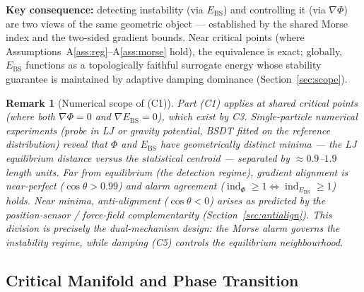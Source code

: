 \documentclass[11pt,a4paper]{article}
\newcommand{\Ebs}{E_{\mathrm{BS}}}
\newcommand{\costheta}{\cos\theta}
\newcommand{\grad}{\nabla}
\DeclareMathOperator{\ind}{ind}
\newtheorem{remark}[theorem]{Remark}
\begin{document}
\noindent
\textbf{Key consequence:} detecting instability (via
$\Ebs$) and controlling it (via $\grad\Phi$) are two views of the
same geometric object --- established by the shared Morse index
and the two-sided gradient bounds.  Near critical points (where
Assumptions~A\ref{ass:reg}--A\ref{ass:morse} hold), the equivalence
is exact; globally, $\Ebs$ functions as a topologically faithful
surrogate energy whose stability guarantee is maintained by
adaptive damping dominance (Section~\ref{sec:scope}).

\begin{remark}[Numerical scope of (C1)]\label{rem:c1num}
Part (C1) applies at \emph{shared} critical points (where both
$\grad\Phi=0$ and $\grad\Ebs=0$), which exist by C3.
Single-particle numerical experiments (probe in LJ or gravity
potential, BSDT fitted on the reference distribution) reveal that
$\Phi$ and $\Ebs$ have geometrically distinct minima --- the LJ
equilibrium distance versus the statistical centroid --- separated
by $\approx 0.9$--$1.9$ length units.  Far from equilibrium
(the detection regime), gradient alignment is near-perfect
($\costheta>0.99$) and alarm agreement
($\ind_\Phi\ge 1 \Leftrightarrow \ind_{\Ebs}\ge 1$) holds.
Near minima, anti-alignment ($\costheta<0$) arises as predicted
by the position-sensor / force-field complementarity
(Section~\ref{sec:antialign}).  This division is precisely
the \emph{dual-mechanism} design: the Morse alarm governs the
instability regime, while damping (C5) controls the equilibrium
neighbourhood.
\end{remark}

\subsection{Critical Manifold and Phase Transition}
\end{document}
